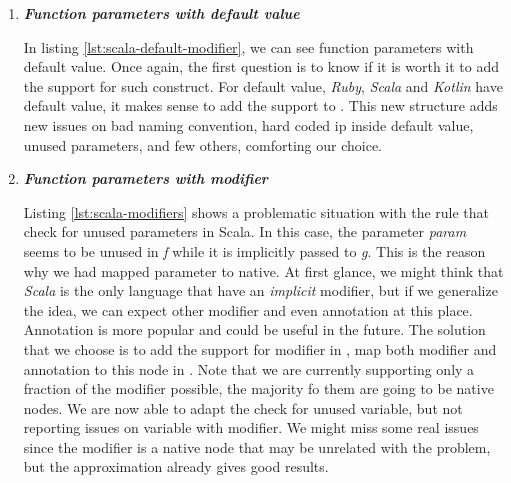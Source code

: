 \begin{enumerate}
	\item \textbf{\textit{Function parameters with default value}} \newline 
	
	
	In listing \ref{lst:scala-default-modifier}, we can see function parameters with default value. Once again, the first question is to know if it is worth it to add the support for such construct. 
	For default value, \emph{Ruby}, \emph{Scala} and \emph{Kotlin} have default value, it makes sense to add the support to \slang{}. 
	This new structure adds new issues on bad naming convention, hard coded ip inside default value, unused parameters, and few others, comforting our choice.

	\item \textbf{\textit{Function parameters with modifier}} \newline 
	 
	
	
	Listing \ref{lst:scala-modifiers} shows a problematic situation with the rule that check for unused parameters in Scala. In this case, the parameter \emph{param} seems to be unused in \emph{f} while it is implicitly passed to \emph{g}.
	This is the reason why we had mapped parameter to native.
	At first glance, we might think that \emph{Scala} is the only language that have an \emph{implicit} modifier, but if we generalize the idea, we can expect other modifier and even annotation at this place. 
	Annotation is more popular and could be useful in the future.
	The solution that we choose is to add the support for modifier in \slang{}, map both modifier and annotation to this node in \slang{}.
	Note that we are currently supporting only a fraction of the modifier possible, the majority fo them are going to be native nodes.
	We are now able to adapt the check for unused variable, but not reporting issues on variable with modifier. 
	We might miss some real issues since the modifier is a native node that may be unrelated with the problem, but the approximation already gives good results.
	
	

\end{enumerate}

